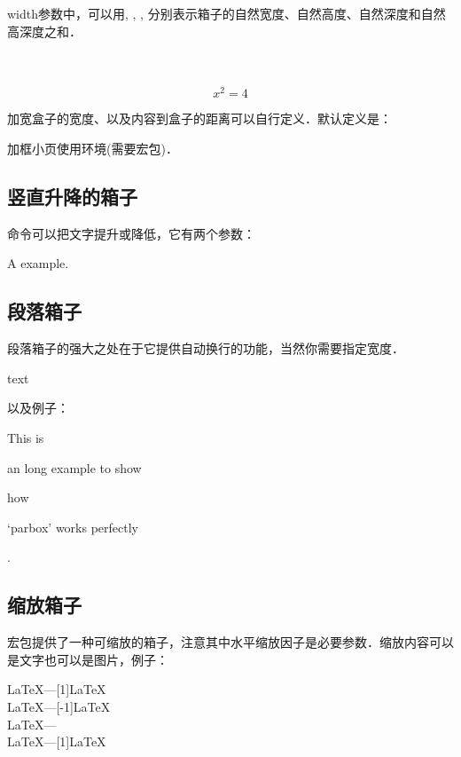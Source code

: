 width参数中，可以用, , , 分别表示箱子的自然宽度、自然高度、自然深度和自然高深度之和．

\begin{codeshow}
 \\
\\
\begin{equation}\boxed{x^2=4}
\end{equation}
\end{codeshow}

加宽盒子的宽度、以及内容到盒子的距离可以自行定义．默认定义是：
\begin{latex}
\setlength{\fboxrule}{0.4pt} \setlength{\fboxsep}{3pt}
\end{latex}

加框小页使用环境(需要宏包)．

\subsection{竖直升降的箱子}
命令可以把文字提升或降低，它有两个参数：

\begin{codeshow}
A\raisebox{-0.5ex}{n} example.
\end{codeshow}

\subsection{段落箱子}
段落箱子的强大之处在于它提供自动换行的功能，当然你需要指定宽度．
\begin{latex}
\parbox[pos]{width}{text}
\end{latex}

以及例子：

\begin{codeshow}
This is \parbox[t]{3.5em}{an long
example to show} how \parbox[b]
{4em}{`parbox' works perfectly}.
\end{codeshow}

\subsection{缩放箱子}
宏包提供了一种可缩放的箱子，注意其中水平缩放因子是必要参数．缩放内容可以是文字也可以是图片，例子：
\begin{codeshow}
\LaTeX---\scalebox{-1}[1]{\LaTeX}\\
\LaTeX---\scalebox{1}[-1]{\LaTeX}\\
\LaTeX---\scalebox{-1}{\LaTeX}\\
\LaTeX---\scalebox{2}[1]{\LaTeX}
\end{codeshow}

